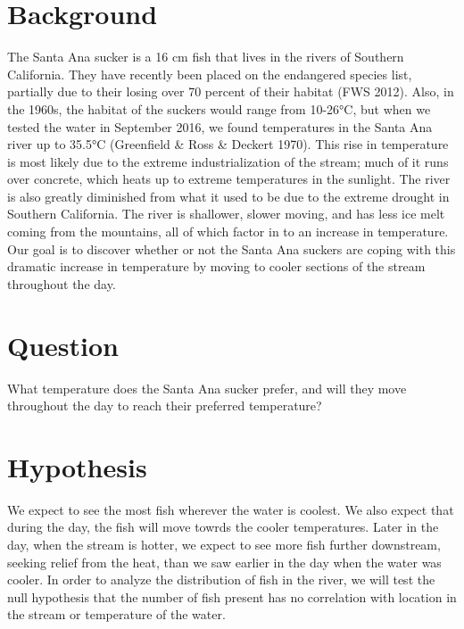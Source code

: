 \documentclass{tufte-handout}
\begin{document}
\section{Background}  The Santa Ana sucker is a 16 cm fish that lives in the rivers of Southern California.  They have recently been placed on the endangered species list, partially due to their losing over 70 percent of their habitat (FWS 2012). Also, in the 1960s, the habitat of the suckers would range from 10-26°C, but when we tested the water in September 2016, we found temperatures in the Santa Ana river up to 35.5°C (Greenfield & Ross & Deckert 1970).  This rise in temperature is most likely due to the extreme industrialization of the stream; much of it runs over concrete, which heats up to extreme temperatures in the sunlight.  The river is also greatly diminished from what it used to be due to the extreme drought in Southern California.  The river is shallower, slower moving, and has less ice melt coming from the mountains, all of which factor in to an increase in temperature.  Our goal is to discover whether or not the Santa Ana suckers are coping with this dramatic increase in temperature by moving to cooler sections of the stream throughout the day.  

\section{Question} What temperature does the Santa Ana sucker prefer, and will they move throughout the day to reach their preferred temperature?

\section{Hypothesis} We expect to see the most fish wherever the water is coolest.  We also expect that during the day, the fish will move towrds the cooler temperatures.  Later in the day, when the stream is hotter, we expect to see more fish further downstream, seeking relief from the heat, than we saw earlier in the day when the water was cooler.  In order to analyze the distribution of fish in the river, we will test the null hypothesis that the number of fish present has no correlation with location in the stream or temperature of the water.
\end{document}

